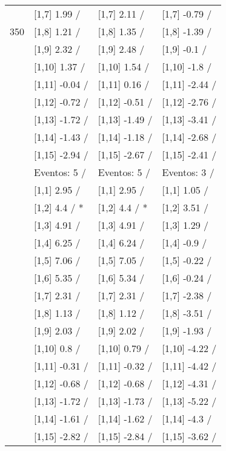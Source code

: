 \begin{table}
\begin{tabular}[t]{llll}
 & {}[1,7] 1.99  / & {}[1,7] 2.11  / & {}[1,7] -0.79  /\\
350 & {}[1,8] 1.21  / & {}[1,8] 1.35  / & {}[1,8] -1.39  /\\
\addlinespace
 & {}[1,9] 2.32  / & {}[1,9] 2.48  / & {}[1,9] -0.1  /\\
 & {}[1,10] 1.37  / & {}[1,10] 1.54  / & {}[1,10] -1.8  /\\
 & {}[1,11] -0.04  / & {}[1,11] 0.16  / & {}[1,11] -2.44  /\\
 & {}[1,12] -0.72  / & {}[1,12] -0.51  / & {}[1,12] -2.76  /\\
 & {}[1,13] -1.72  / & {}[1,13] -1.49  / & {}[1,13] -3.41  /\\
\addlinespace
 & {}[1,14] -1.43  / & {}[1,14] -1.18  / & {}[1,14] -2.68  /\\
 & {}[1,15] -2.94  / & {}[1,15] -2.67  / & {}[1,15] -2.41  /\\
 & Eventos:  5 / & Eventos:  5 / & Eventos:  3 /\\
 & {}[1,1] 2.95  / & {}[1,1] 2.95  / & {}[1,1] 1.05  /\\
 & {}[1,2] 4.4  / * & {}[1,2] 4.4  / * & {}[1,2] 3.51  /\\
\addlinespace
 & {}[1,3] 4.91  / & {}[1,3] 4.91  / & {}[1,3] 1.29  /\\
 & {}[1,4] 6.25  / & {}[1,4] 6.24  / & {}[1,4] -0.9  /\\
 & {}[1,5] 7.06  / & {}[1,5] 7.05  / & {}[1,5] -0.22  /\\
 & {}[1,6] 5.35  / & {}[1,6] 5.34  / & {}[1,6] -0.24  /\\
 & {}[1,7] 2.31  / & {}[1,7] 2.31  / & {}[1,7] -2.38  /\\
\addlinespace
500 & {}[1,8] 1.13  / & {}[1,8] 1.12  / & {}[1,8] -3.51  /\\
 & {}[1,9] 2.03  / & {}[1,9] 2.02  / & {}[1,9] -1.93  /\\
 & {}[1,10] 0.8  / & {}[1,10] 0.79  / & {}[1,10] -4.22  /\\
 & {}[1,11] -0.31  / & {}[1,11] -0.32  / & {}[1,11] -4.42  /\\
 & {}[1,12] -0.68  / & {}[1,12] -0.68  / & {}[1,12] -4.31  /\\
\addlinespace
 & {}[1,13] -1.72  / & {}[1,13] -1.73  / & {}[1,13] -5.22  /\\
 & {}[1,14] -1.61  / & {}[1,14] -1.62  / & {}[1,14] -4.3  /\\
 & {}[1,15] -2.82  / & {}[1,15] -2.84  / & {}[1,15] -3.62  /\\
\bottomrule
\end{tabular}
\end{table}
